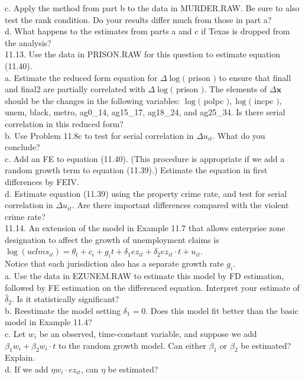 \documentclass[10pt]{article}
\begin{document}
c. Apply the method from part b to the data in MURDER.RAW. Be sure to also test the rank condition. Do your results differ much from those in part a?\\
d. What happens to the estimates from parts a and c if Texas is dropped from the analysis?\\
11.13. Use the data in PRISON.RAW for this question to estimate equation (11.40).\\
a. Estimate the reduced form equation for $\Delta \log ($ prison $)$ to ensure that finall and final2 are partially correlated with $\Delta \log ($ prison $)$. The elements of $\Delta \mathbf{x}$ should be the changes in the following variables: $\log ($ polpc $), \log ($ incpc $)$, unem, black, metro, ag0\_14, ag15\_17, ag18\_24, and ag25\_34. Is there serial correlation in this reduced form?\\
b. Use Problem 11.8c to test for serial correlation in $\Delta u_{i t}$. What do you conclude?\\
c. Add an FE to equation (11.40). (This procedure is appropriate if we add a random growth term to equation (11.39).) Estimate the equation in first differences by FEIV.\\
d. Estimate equation (11.39) using the property crime rate, and test for serial correlation in $\Delta u_{i t}$. Are there important differences compared with the violent crime rate?\\
11.14. An extension of the model in Example 11.7 that allows enterprise zone designation to affect the growth of unemployment claims is\\
$\log \left(u c l m s_{i t}\right)=\theta_{t}+c_{i}+g_{i} t+\delta_{1} e z_{i t}+\delta_{2} e z_{i t} \cdot t+u_{i t}$.\\
Notice that each jurisdiction also has a separate growth rate $g_{i}$.\\
a. Use the data in EZUNEM.RAW to estimate this model by FD estimation, followed by FE estimation on the differenced equation. Interpret your estimate of $\hat{\delta}_{2}$. Is it statistically significant?\\
b. Reestimate the model setting $\delta_{1}=0$. Does this model fit better than the basic model in Example 11.4?\\
c. Let $w_{i}$ be an observed, time-constant variable, and suppose we add $\beta_{1} w_{i}+\beta_{2} w_{i} \cdot t$ to the random growth model. Can either $\beta_{1}$ or $\beta_{2}$ be estimated? Explain.\\
d. If we add $\eta w_{i} \cdot e z_{i t}$, can $\eta$ be estimated?\\
\end{document}
